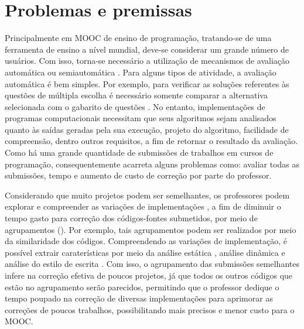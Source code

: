 \chapter{Problemas e premissas}
\label{chapter:problemas-premissas}

Principalmente em \acs{MOOC} de ensino de programação, tratando-se de uma ferramenta de
ensino a nível mundial, deve-se considerar um grande número de usuários. Com isso,
torna-se necessário a utilização de mecanismos de avaliação automática ou
semiautomática \cite{schmidt2013producing}. Para alguns tipos de atividade, a
avaliação automática é bem simples. Por exemplo, para verificar as soluções
referentes às questões de múltipla escolha é necessário somente comparar a
alternativa selecionada com o gabarito de questões \cite{alario2013analysing}. No
entanto, implementações de programas computacionais necessitam que seus algoritmos
sejam analisados quanto às saídas geradas pela sua execução, projeto do algoritmo,
facilidade de compreensão, dentro outros requisitos, a fim de retornar o resultado
da avaliação. Como há uma grande quantidade de submissões de trabalhos em cursos
de programação, consequentemente acarreta alguns problemas como: avaliar todas as
submissões, tempo e aumento de custo de correção por parte do professor.

Considerando que muito projetos podem ser semelhantes, os professores podem explorar
e compreender as variações de implementações \cite{Yin:2015}, a fim de diminuir
o tempo gasto para correção dos códigos-fontes submetidos, por meio de agrupamentos
(). Por exemplo, tais agrupamentos podem ser realizados por meio
da similaridade dos códigos. Compreendendo as variações de implementação, é possível
extrair caraterísticas por meio da análise estática \cite{Yin:2015,Glassman:2014,Taherkhani:2012},
análise dinâmica \cite{Glassman:2015} e análise do estilo de escrita \cite{Wei2015}.
Com	isso, o agrupamento das submissões semelhantes infere na correção efetiva de
poucos projetos, já que todos os outros códigos que estão no agrupamento serão
parecidos, permitindo que o professor dedique o tempo poupado na correção de diversas
implementações para aprimorar as correções de poucos trabalhos, possibilitando
 mais precisos e menor custo para o \acs{MOOC}.
